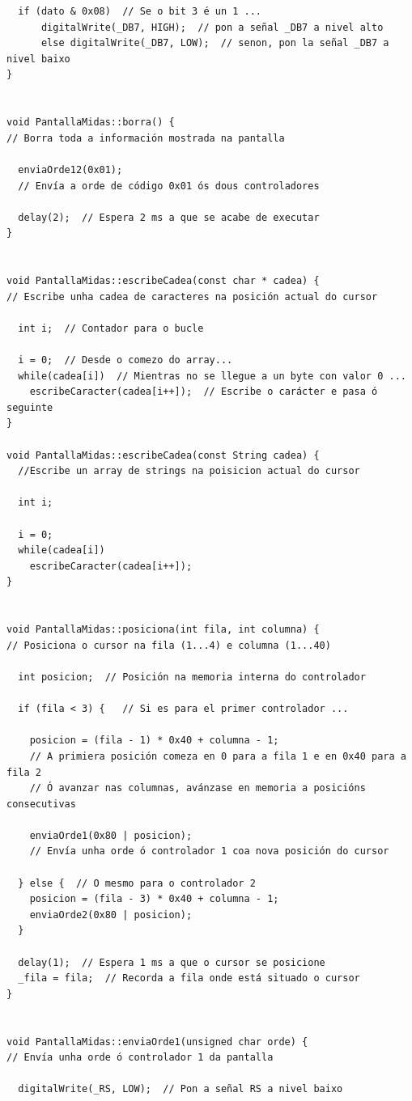 \documentclass[11pt,twoside]{book}
\begin{document}
\begin{lstlisting}
  if (dato & 0x08)  // Se o bit 3 é un 1 ...
      digitalWrite(_DB7, HIGH);  // pon a señal _DB7 a nivel alto
      else digitalWrite(_DB7, LOW);  // senon, pon la señal _DB7 a nivel baixo
}


void PantallaMidas::borra() {
// Borra toda a información mostrada na pantalla

  enviaOrde12(0x01); 
  // Envía a orde de código 0x01 ós dous controladores
  
  delay(2);  // Espera 2 ms a que se acabe de executar
}


void PantallaMidas::escribeCadea(const char * cadea) {
// Escribe unha cadea de caracteres na posición actual do cursor

  int i;  // Contador para o bucle
  
  i = 0;  // Desde o comezo do array...
  while(cadea[i])  // Mientras no se llegue a un byte con valor 0 ...
    escribeCaracter(cadea[i++]);  // Escribe o carácter e pasa ó seguinte
}

void PantallaMidas::escribeCadea(const String cadea) {
  //Escribe un array de strings na poisicion actual do cursor

  int i;

  i = 0;
  while(cadea[i])
    escribeCaracter(cadea[i++]);
}


void PantallaMidas::posiciona(int fila, int columna) {
// Posiciona o cursor na fila (1...4) e columna (1...40)

  int posicion;  // Posición na memoria interna do controlador

  if (fila < 3) {   // Si es para el primer controlador ...
    
    posicion = (fila - 1) * 0x40 + columna - 1;
    // A primiera posición comeza en 0 para a fila 1 e en 0x40 para a fila 2
    // Ó avanzar nas columnas, avánzase en memoria a posicións consecutivas
    
    enviaOrde1(0x80 | posicion);
    // Envía unha orde ó controlador 1 coa nova posición do cursor
    
  } else {  // O mesmo para o controlador 2
    posicion = (fila - 3) * 0x40 + columna - 1;
    enviaOrde2(0x80 | posicion);
  }
  
  delay(1);  // Espera 1 ms a que o cursor se posicione
  _fila = fila;  // Recorda a fila onde está situado o cursor
}


void PantallaMidas::enviaOrde1(unsigned char orde) {
// Envía unha orde ó controlador 1 da pantalla

  digitalWrite(_RS, LOW);  // Pon a señal RS a nivel baixo
  

\end{lstlisting}
\end{document}
